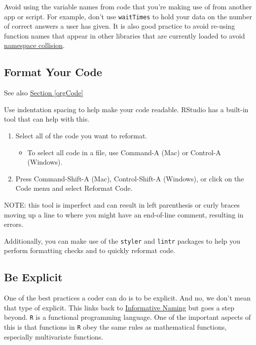 \documentclass[
]{book}
\providecommand{\tightlist}{%
  \setlength{\itemsep}{0pt}\setlength{\parskip}{0pt}}
\begin{document}
Avoid using the variable names from code that you're making use of from another app or script. For example, don't use \texttt{waitTimes} to hold your data on the number of correct answers a user has given. It is also good practice to avoid re-using function names that appear in other libraries that are currently loaded to avoid \href{https://en.wikipedia.org/wiki/Naming_collision}{namespace collision}.

\hypertarget{formatCode}{%
\subsection{Format Your Code}\label{formatCode}}

See also \protect\hyperlink{orgCode}{Section \ref{orgCode}}

Use indentation spacing to help make your code readable. RStudio has a built-in tool that can help with this.

\begin{enumerate}
\def\labelenumi{\arabic{enumi}.}
\tightlist
\item
  Select all of the code you want to reformat.

  \begin{itemize}
  \tightlist
  \item
    To select all code in a file, use Command-A (Mac) or Control-A (Windows).
  \end{itemize}
\item
  Press Command-Shift-A (Mac), Control-Shift-A (Windows), or click on the Code menu and select Reformat Code.
\end{enumerate}

NOTE: this tool is imperfect and can result in left parenthesis or curly braces moving up a line to where you might have an end-of-line comment, resulting in errors.

Additionally, you can make use of the \texttt{styler} and \texttt{lintr} packages to help you perform formatting checks and to quickly reformat code.

\hypertarget{explicit}{%
\subsection{Be Explicit}\label{explicit}}

One of the best practices a coder can do is to be explicit. And no, we don't mean that type of explicit. This links back to \protect\hyperlink{naming}{Informative Naming} but goes a step beyond. \texttt{R} is a functional programming language. One of the important aspects of this is that functions in \texttt{R} obey the same rules as mathematical functions, especially multivariate functions.
\end{document}
